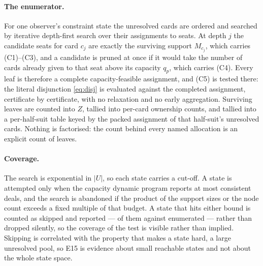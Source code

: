 \paragraph{The enumerator.} For one observer's constraint state the unresolved
cards are ordered and searched by iterative depth-first search over their
assignments to seats. At depth $j$ the candidate seats for card $c_j$ are exactly
the surviving support $M_{c_j}$, which carries (C1)--(C3), and a candidate is
pruned at once if it would take the number of cards already given to that seat
above its capacity $q_p$, which carries (C4). Every leaf is therefore a complete
capacity-feasible assignment, and (C5) is tested there: the literal disjunction
\eqref{eq:disj} is evaluated against the completed assignment, certificate by
certificate, with no relaxation and no early aggregation. Surviving leaves are
counted into $Z$, tallied into per-card ownership counts, and tallied into a
per-half-suit table keyed by the packed assignment of that half-suit's unresolved
cards. Nothing is factorised: the count behind every named allocation is an
explicit count of leaves.

\paragraph{Coverage.} The search is exponential in $|U|$, so each state carries a
cut-off. A state is attempted only when the capacity dynamic program reports at
most \numOracleMaxDeals{} consistent deals, and the search is abandoned if the
product of the support sizes or the node count exceeds a fixed multiple of that
budget. A state that hits either bound is counted as skipped and reported ---
\numOracleStatesSkipped{} of them against \numOracleStates{} enumerated --- rather
than dropped silently, so the coverage of the test is visible rather than implied.
Skipping is correlated with the property that makes a state hard, a large
unresolved pool, so E15 is evidence about small reachable states and not about
the whole state space.

